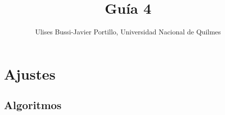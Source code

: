 \documentclass[a4paper,11pt]{article}
\makeatletter
\theoremstyle{mytheor}
\renewcommand{\maketitle}{
\colorbox{gray!20}{\framebox[\linewidth]{ \huge \textsc{\@title} } 
\lfoot{\@title}
}

}
\makeatother
\begin{document}
\title{Guía 4}

\author{Ulises Bussi-Javier Portillo, Universidad Nacional de Quilmes}


\maketitle \vspace{20pt}

\section*{Ajustes}
%

\subsection*{Algoritmos}
\end{document}

